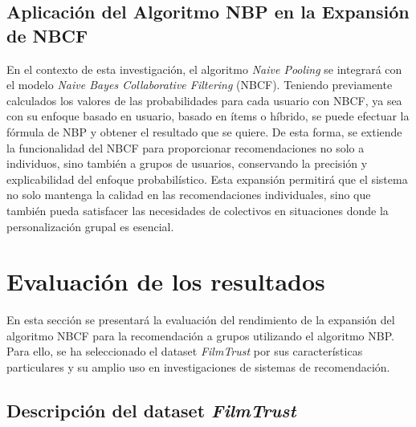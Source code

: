 \documentclass[runningheads,a4paper]{llncs}
\begin{document}
\subsection{Aplicación del Algoritmo NBP en la Expansión de NBCF}

En el contexto de esta investigación, el algoritmo 
\textit{Naive Pooling} se integrará con el modelo 
\textit{Naive Bayes Collaborative Filtering} (NBCF). 
Teniendo previamente calculados los valores de las 
probabilidades para cada usuario con NBCF, ya sea con 
su enfoque basado en usuario, basado en ítems o híbrido,
se puede efectuar la fórmula de NBP y obtener el resultado 
que se quiere. De esta forma, se extiende 
la funcionalidad del NBCF para proporcionar 
recomendaciones no solo a individuos, sino también a 
grupos de usuarios, conservando la precisión y 
explicabilidad del enfoque probabilístico. 
Esta expansión permitirá que el sistema no solo 
mantenga la calidad en las recomendaciones 
individuales, sino que también pueda satisfacer las 
necesidades de colectivos en situaciones donde la 
personalización grupal es esencial.

\section{Evaluación de los resultados}

En esta sección se presentará la evaluación del 
rendimiento de la expansión del algoritmo NBCF para 
la recomendación a grupos utilizando el algoritmo NBP. 
Para ello, se ha seleccionado el dataset \textit{FilmTrust}
 por sus características particulares y su amplio uso 
 en investigaciones de sistemas de recomendación.

 \subsection{Descripción del dataset \textit{FilmTrust}}
\end{document}

